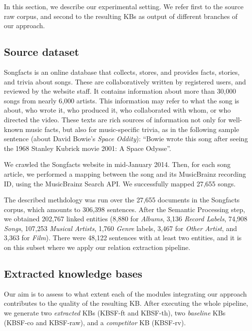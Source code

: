 In this section, we describe our experimental setting. We refer first to the source raw corpus, and second to the resulting KBs as output of different branches of our approach.


\subsection{Source dataset}\label{sec:kb:exp:dataset}

Songfacts is an online database that collects, stores, and provides facts, stories, and trivia about songs. These are collaboratively written by registered users, and reviewed by the website staff. It contains information about more than 30,000 songs from nearly 6,000 artists. This information may refer to what the song is about, who wrote it, who produced it, who collaborated with whom, or who directed the video. These texts are rich sources of information not only for well-known music facts, but also for music-specific trivia, as in the following sample sentence (about David Bowie's \textit{Space Oddity}): ``Bowie wrote this song after seeing the 1968 Stanley Kubrick movie 2001: A Space Odysse''.

We crawled the Songfacts website in mid-January 2014. Then, for each song article, we performed a mapping between the song and its MusicBrainz recording ID, using the MusicBrainz Search API. We successfully mapped 27,655 songs.

The described methdology was run over the 27,655 documents in the Songfacts corpus, which amounts to 306,398 sentences. After the Semantic Processing step, we obtained 202,767 linked entities (8,880 for \textit{Albums}, 3,136 \textit{Record Labels}, 74,908 \textit{Songs}, 107,253 \textit{Musical Artists}, 1,760 \textit{Genre} labels, 3,467 for \textit{Other Artist}, and 3,363 for \textit{Film}). There were 48,122 sentences with at least two entities, and it is on this subset where we apply our relation extraction pipeline.


\subsection{Extracted knowledge bases}
\label{sec:kb:exp:learnedkbs}

Our aim is to assess to what extent each of the modules integrating our approach contributes to the quality of the resulting KB. After executing the whole pipeline, we generate two \textit{extracted} KBs (\textsc{KBSF}-ft and \textsc{KBSF}-th), two \textit{baseline} KBs (\textsc{KBSF}-co and \textsc{KBSF}-raw), and a \textit{competitor} KB (\textsc{KBSF}-rv). 

